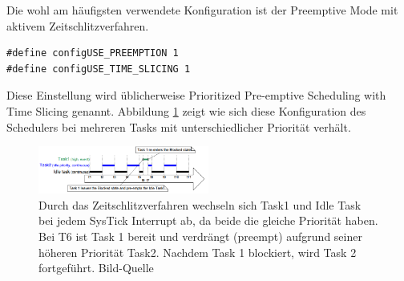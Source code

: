 \newline
Die wohl am häufigsten verwendete Konfiguration ist der Preemptive Mode mit aktivem Zeitschlitzverfahren.
\begin{lstlisting}[numbers = none]
#define configUSE_PREEMPTION 1
#define configUSE_TIME_SLICING 1
\end{lstlisting}
Diese Einstellung wird üblicherweise Prioritized Pre-emptive Scheduling with Time Slicing genannt. Abbildung \ref{fig:timeslice} zeigt wie sich diese Konfiguration des Schedulers bei mehreren Tasks mit unterschiedlicher Priorität verhält.
\begin{figure}[htb]
	\centering
		\includegraphics[width=0.5\textwidth]{Pictures/Scheduling/timeslice2.png}
	\caption{Durch das Zeitschlitzverfahren wechseln sich Task1 und Idle Task bei jedem SysTick Interrupt ab, da beide die gleiche Priorität haben. Bei T6 ist Task 1 bereit und verdrängt (preempt) aufgrund seiner höheren Priorität Task2. Nachdem Task 1 blockiert, wird Task 2 fortgeführt. Bild-Quelle~\protect{}}
	\label{fig:timeslice}
\end{figure}
